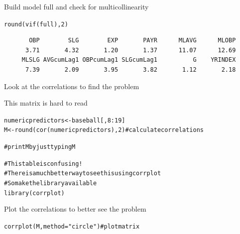 \documentclass{beamer}\usepackage[]{graphicx}\usepackage[]{color}
\makeatletter
\newcommand{\hlnum}[1]{\textcolor[rgb]{0.824,0.412,0.118}{#1}}%
\newcommand{\hlstr}[1]{\textcolor[rgb]{1,0.894,0.71}{#1}}%
\newcommand{\hlcom}[1]{\textcolor[rgb]{0.824,0.706,0.549}{#1}}%
\newcommand{\hlopt}[1]{\textcolor[rgb]{1,0.894,0.769}{#1}}%
\newcommand{\hlstd}[1]{\textcolor[rgb]{1,0.894,0.769}{#1}}%
\newcommand{\hlkwb}[1]{\textcolor[rgb]{0.804,0.776,0.451}{#1}}%
\newcommand{\hlkwc}[1]{\textcolor[rgb]{0.78,0.941,0.545}{#1}}%
\newcommand{\hlkwd}[1]{\textcolor[rgb]{1,0.78,0.769}{#1}}%
\newenvironment{kframe}{%
 \def\at@end@of@kframe{}%
 \ifinner\ifhmode%
  \def\at@end@of@kframe{\end{minipage}}%
  \begin{minipage}{\columnwidth}%
 \fi\fi%
 \def\FrameCommand##1{\hskip\@totalleftmargin \hskip-\fboxsep
 \colorbox{shadecolor}{##1}\hskip-\fboxsep
     \hskip-\linewidth \hskip-\@totalleftmargin \hskip\columnwidth}%
 \MakeFramed {\advance\hsize-\width
   \@totalleftmargin\z@ \linewidth\hsize
   \@setminipage}}%
 {\par\unskip\endMakeFramed%
 \at@end@of@kframe}
\newenvironment{knitrout}{}{} %
\makeatother
\begin{document}
\begin{darkframes}
\begin{frame}[fragile]{Build model full and check for multicollinearity}
\begin{knitrout}
\begin{kframe}
\begin{alltt}
\hlkwd{round}\hlstd{(}\hlkwd{vif}\hlstd{(full),}\hlnum{2}\hlstd{)}
\end{alltt}
\begin{verbatim}
       OBP        SLG        EXP       PAYR      MLAVG      MLOBP 
      3.71       4.32       1.20       1.37      11.07      12.69 
     MLSLG AVGcumLag1 OBPcumLag1 SLGcumLag1          G    YRINDEX 
      7.39       2.09       3.95       3.82       1.12       2.18 
\end{verbatim}
\end{kframe}
\end{knitrout}
      
      \pause
      \fontsize{10}{10}\selectfont{Uh oh. Houston, we have a problem!}

      \lc %
    \end{frame}


    \begin{frame}[fragile]{Look at the correlations to find the problem}
      \fontsize{8}{8}\selectfont  

      {This matrix is hard to read}
\begin{knitrout}
\begin{kframe}
\begin{alltt}
\hlstd{numericpredictors} \hlkwb{<-} \hlstd{baseball[,}\hlnum{8}\hlopt{:}\hlnum{19}\hlstd{]}
\hlstd{M} \hlkwb{<-} \hlkwd{round}\hlstd{(}\hlkwd{cor}\hlstd{(numericpredictors),}\hlnum{2}\hlstd{)} \hlcom{# calculate correlations}

\hlcom{# print M by just typing M}

\hlcom{# This table is confusing!}
\hlcom{# There is a much better way to see this using corrplot}
\hlcom{# So make the library available}
\hlkwd{library}\hlstd{(corrplot)}
\end{alltt}
\end{kframe}
\end{knitrout}
      
      \lc %
    \end{frame}


    \begin{frame}[fragile]{Plot the correlations to better see the problem}
      \fontsize{8}{8}\selectfont  

\begin{knitrout}
\begin{kframe}
\begin{alltt}
\hlkwd{corrplot}\hlstd{(M,} \hlkwc{method} \hlstd{=} \hlstr{"circle"}\hlstd{)} \hlcom{#plot matrix}
\end{alltt}
\end{kframe}



\end{knitrout}
\end{frame}
\end{darkframes}
\end{document}
